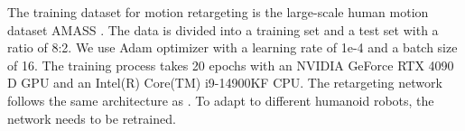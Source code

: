 \documentclass[a4paper, 10pt, conference]{ieeeconf}      %
\begin{document}
The training dataset for motion retargeting is the large-scale human motion dataset AMASS \cite{c30}. The data is divided into a training set and a test set with a ratio of 8:2. We use Adam optimizer with a learning rate of 1e-4 and a batch size of 16. The training process takes 20 epochs with an NVIDIA GeForce RTX 4090 D GPU and an Intel(R) Core(TM) i9-14900KF CPU. The retargeting network follows the same architecture as \cite{c10}. To adapt to different humanoid robots, the network needs to be retrained.

     
\end{document}
